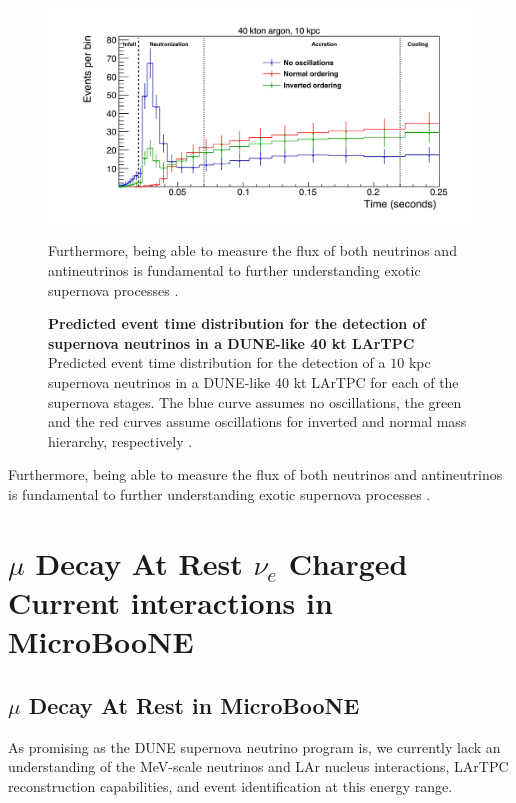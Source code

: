 \begin{figure}[h!]
    \centering
    \includegraphics[width=150mm]{Figures/dune_supernova.jpeg}
    \caption[Predicted event time distribution for the detection of supernova neutrinos in a DUNE-like $40$ kt LArTPC]{{\textbf{Predicted event time distribution for the detection of supernova neutrinos in a DUNE-like 40 kt LArTPC}}\\ Predicted event time distribution for the detection of a $10$ kpc supernova neutrinos in a DUNE-like 40 kt LArTPC for each of the supernova stages. The blue curve assumes no oscillations, the green and the red curves assume oscillations for inverted and normal mass hierarchy, respectively \cite{kate_scholberg}.}Furthermore, being able to measure the flux of both neutrinos and antineutrinos is fundamental to further understanding exotic supernova processes \cite{Friedland}.
    \label{dune_supernova}
\end{figure}

Furthermore, being able to measure the flux of both neutrinos and antineutrinos is fundamental to further understanding exotic supernova processes \cite{Friedland}. 

\section{$\mu$ Decay At Rest $\nu_e$ Charged Current interactions in MicroBooNE}

\subsection{$\mu$ Decay At Rest in MicroBooNE}
As promising as the DUNE supernova neutrino program is, we currently lack an understanding of the MeV-scale neutrinos and LAr nucleus interactions, LArTPC reconstruction capabilities, and event identification at this energy range. 

